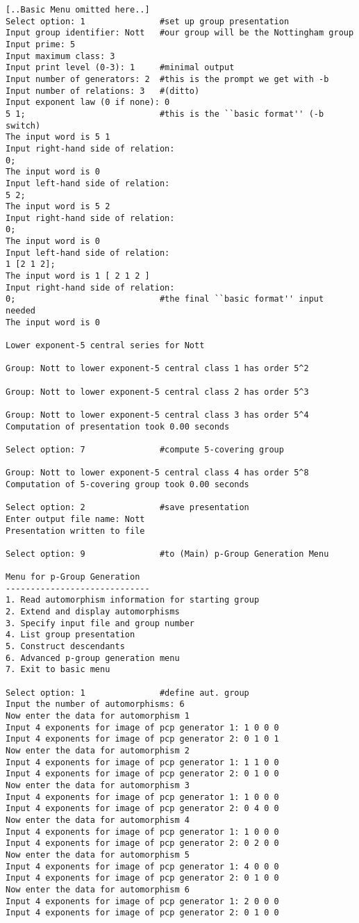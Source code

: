 \documentclass[12pt]{article}
\begin{document}
\begin{verbatim}
[..Basic Menu omitted here..]
Select option: 1               #set up group presentation
Input group identifier: Nott   #our group will be the Nottingham group
Input prime: 5
Input maximum class: 3
Input print level (0-3): 1     #minimal output
Input number of generators: 2  #this is the prompt we get with -b
Input number of relations: 3   #(ditto)
Input exponent law (0 if none): 0
5 1;                           #this is the ``basic format'' (-b switch)
The input word is 5 1 
Input right-hand side of relation:
0;  
The input word is 0 
Input left-hand side of relation:
5 2;
The input word is 5 2 
Input right-hand side of relation:
0;
The input word is 0 
Input left-hand side of relation:
1 [2 1 2];
The input word is 1 [ 2 1 2 ]
Input right-hand side of relation:
0;                             #the final ``basic format'' input needed
The input word is 0 

Lower exponent-5 central series for Nott

Group: Nott to lower exponent-5 central class 1 has order 5^2

Group: Nott to lower exponent-5 central class 2 has order 5^3

Group: Nott to lower exponent-5 central class 3 has order 5^4
Computation of presentation took 0.00 seconds

Select option: 7               #compute 5-covering group

Group: Nott to lower exponent-5 central class 4 has order 5^8
Computation of 5-covering group took 0.00 seconds

Select option: 2               #save presentation
Enter output file name: Nott
Presentation written to file

Select option: 9               #to (Main) p-Group Generation Menu

Menu for p-Group Generation
-----------------------------
1. Read automorphism information for starting group
2. Extend and display automorphisms
3. Specify input file and group number
4. List group presentation
5. Construct descendants
6. Advanced p-group generation menu
7. Exit to basic menu

Select option: 1               #define aut. group
Input the number of automorphisms: 6
Now enter the data for automorphism 1
Input 4 exponents for image of pcp generator 1: 1 0 0 0
Input 4 exponents for image of pcp generator 2: 0 1 0 1
Now enter the data for automorphism 2
Input 4 exponents for image of pcp generator 1: 1 1 0 0
Input 4 exponents for image of pcp generator 2: 0 1 0 0
Now enter the data for automorphism 3
Input 4 exponents for image of pcp generator 1: 1 0 0 0 
Input 4 exponents for image of pcp generator 2: 0 4 0 0 
Now enter the data for automorphism 4
Input 4 exponents for image of pcp generator 1: 1 0 0 0
Input 4 exponents for image of pcp generator 2: 0 2 0 0 
Now enter the data for automorphism 5
Input 4 exponents for image of pcp generator 1: 4 0 0 0 
Input 4 exponents for image of pcp generator 2: 0 1 0 0 
Now enter the data for automorphism 6
Input 4 exponents for image of pcp generator 1: 2 0 0 0 
Input 4 exponents for image of pcp generator 2: 0 1 0 0 


\end{verbatim}
\end{document}
